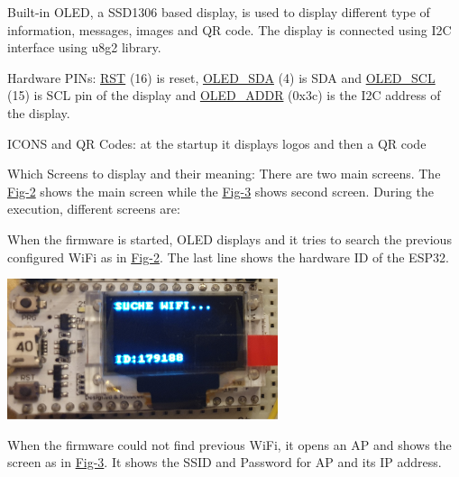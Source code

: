 Built-\/in O\+L\+ED, a S\+S\+D1306 based display, is used to display different type of information, messages, images and QR code. The display is connected using I2C interface using u8g2 library.
\begin{DoxyItemize}
\item Hardware P\+I\+Ns\+: \mbox{\hyperlink{main_8h_ac5d957e4fd3dc11cd97a54cf9ca057a4}{R\+ST}} (16) is reset, \mbox{\hyperlink{main_8h_afbf31d4d5bad7fd61418b8b8036df96c}{O\+L\+E\+D\+\_\+\+S\+DA}} (4) is S\+DA and \mbox{\hyperlink{main_8h_ad3ddbbb48cad4c34406916e199b89122}{O\+L\+E\+D\+\_\+\+S\+CL}} (15) is S\+CL pin of the display and \mbox{\hyperlink{main_8h_a7dfa2c4cfbfcba36416046052e7943e8}{O\+L\+E\+D\+\_\+\+A\+D\+DR}} (0x3c) is the I2C address of the display.
\item I\+C\+O\+NS and QR Codes\+: at the startup it displays logos and then a QR code
\item Which Screens to display and their meaning\+: There are two main screens. The \mbox{\hyperlink{index_Fig-2}{Fig-\/2}} shows the main screen while the \mbox{\hyperlink{index_Fig-3}{Fig-\/3}} shows second screen. During the execution, different screens are\+:
\begin{DoxyEnumerate}
\item When the firmware is started, O\+L\+ED displays and it tries to search the previous configured Wi\+Fi as in \mbox{\hyperlink{index_Fig-2}{Fig-\/2}}. The last line shows the hardware ID of the E\+S\+P32. \label{index_Fig-2}%
%
  
\begin{DoxyImage}
\includegraphics[width=300px]{searchwifi}
\end{DoxyImage}

\item When the firmware could not find previous Wi\+Fi, it opens an AP and shows the screen as in \mbox{\hyperlink{index_Fig-3}{Fig-\/3}}. It shows the S\+S\+ID and Password for AP and its IP address. \label{index_Fig-3}%
%
  

\end{DoxyEnumerate}
\end{DoxyItemize}
